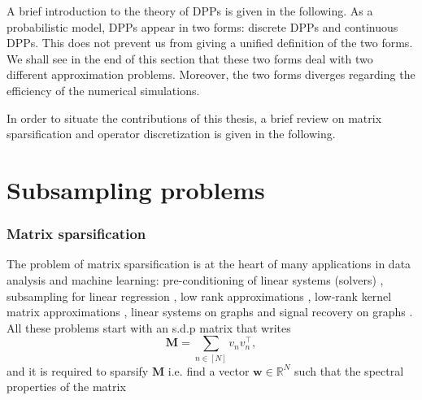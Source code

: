 \documentclass[twoside,11pt]{book}
\numberwithin{theorem}{chapter}
\numberwithin{definition}{chapter}
\numberwithin{proposition}{chapter}
\numberwithin{corollary}{chapter}
\numberwithin{example}{chapter}
\numberwithin{lemma}{chapter}
\numberwithin{assumption}{chapter}
\DeclareMathOperator{\Tran}{\intercal}
\begin{document}
A brief introduction to the theory of DPPs is given in the following. As a probabilistic model, DPPs appear in two forms: discrete DPPs and continuous DPPs. This does not prevent us from giving a unified definition of the two forms. We shall see in the end of this section that these two forms deal with two different approximation problems. Moreover, the two forms diverges regarding the efficiency of the numerical simulations.

In order to situate the contributions of this thesis, a brief review on matrix sparsification and operator discretization is given in the following.


\section{Subsampling problems}



\subsubsection{Matrix sparsification}
The problem of matrix sparsification is at the heart of many applications in data analysis and machine learning: pre-conditioning of linear systems (solvers) \citep{Golub1965}, subsampling for linear regression \citep*{DrMaMu06}, low rank approximations \citep*{DrMaMu07}, low-rank kernel matrix approximations \citep{Bac13,AlMa15}, linear systems on graphs \citep*{SpTe04,SpSr11} and signal recovery on graphs \citep*{PuTrGrVa18}. All these problems start with an s.d.p matrix that writes
\begin{equation}
\bm{M} = \sum\limits_{n \in [N]} v_{n}v_{n}^{\Tran},
\end{equation}
and it is required to sparsify $\bm{M}$ i.e. find a vector $\bm{w} \in \mathbb{R}^{N}$ such that the spectral properties of the matrix
\end{document}
